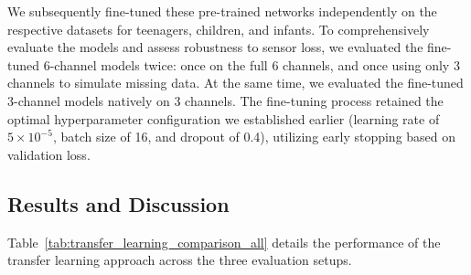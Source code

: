 We subsequently fine-tuned these pre-trained networks independently on the respective datasets for teenagers, children, and infants. To comprehensively evaluate the models and assess robustness to sensor loss, we evaluated the fine-tuned 6-channel models twice: once on the full 6 channels, and once using only 3 channels to simulate missing data. At the same time, we evaluated the fine-tuned 3-channel models natively on 3 channels. The fine-tuning process retained the optimal hyperparameter configuration we established earlier (learning rate of $5 \times 10^{-5}$, batch size of 16, and dropout of 0.4), utilizing early stopping based on validation loss.

\subsection{Results and Discussion}

Table~\ref{tab:transfer_learning_comparison_all} details the performance of the transfer learning approach across the three evaluation setups. 

\begin{table}[ht]
\centering
\caption{\textbf{Transfer Learning Performance Across Target Demographics.} This table presents the evaluation metrics for each cohort after fine-tuning adult pre-trained base models. It shows that adult priors work better on teenage cohorts which are similar to the adult population and provide regularization that substantially buffers against performance collapse during sensor loss.} \label{tab:transfer_learning_comparison_all}
\end{table}

